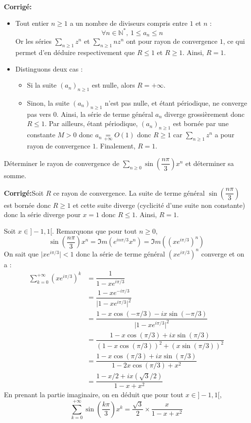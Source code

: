\documentclass[a4paper,twoside,french,11pt]{VcCours}
\newcommand{\Sum}[2]{\sum_{#1}^{#2}}
\newcommand{\corr}{\textbf{Corrigé:}}
\begin{document}
\newpage

\corr 
\begin{itemize}
\item Tout entier $n\geq 1$ a un nombre de diviseurs compris entre $1$ et $n$ :
\[
\forall n\in\mathbb{N}^*,\ 1\leq a_n \leq n
\]
Or les séries $\Sum{n\geq 1}{} z^n$ et $\Sum{n\geq 1}{}n z^n$ ont pour rayon de convergence $1$, ce qui permet d'en déduire respectivement que $R\leq 1$ et $R\geq 1$.  Ainsi, $R=1$.
\item Distinguons deux cas :
\begin{itemize}
\item Si la suite $(a_n)_{n\geq 1}$ est nulle, alors $R=+\infty$.
\item Sinon, la suite $(a_n)_{n\geq 1}$ n'est pas nulle, et étant périodique, ne converge pas vers $0$. Ainsi, la série de terme général $a_n$ diverge grossièrement donc $R\leq 1$. Par ailleurs, étant périodique, $(a_n)_{n\geq 1}$ est bornée par une constante $M>0$ donc $a_n  \underset{+ \infty}{=} O(1)$ donc $R \geq 1$ car $\Sum{n\geq 1}{} z^n$ a pour rayon de convergence $1$. Finalement, $R=1$.
\end{itemize}
\end{itemize}

\begin{Exercice}{}
Déterminer le rayon de convergence de $\Sum{n\geq 0}{} \sin \left( \dfrac{n \pi}{3} \right) x^n$ et déterminer sa somme.
\end{Exercice}

\corr Soit $R$ ce rayon de convergence. La suite de terme général $\sin \left( \dfrac{n \pi}{3} \right)$ est bornée donc $R \geq 1$ et cette suite diverge (cyclicité d'une suite non constante) donc la série diverge pour $x=1$ donc $R \leq 1$. Ainsi, $R=1$.


Soit $x \in ]-1,1[$. Remarquons que pour tout $n \geq 0$,
$$ \sin \left( \dfrac{n \pi}{3} \right) x^n = \Im m (e^{in \pi/3} x^n) = \Im m ((xe^{i \pi/3})^n)$$
On sait que $\vert xe^{i \pi/3} \vert <1$ donc la série de terme général $(xe^{i \pi/3})^n$ converge et on a :
\begin{align*}
\sum_{k=0}^{+ \infty} (xe^{i \pi/3})^k & = \dfrac{1}{1-xe^{i \pi/3}} \\
& = \dfrac{1-xe^{-i \pi/3}}{\vert 1-x e^{i \pi/3}\vert^2} \\
& = \dfrac{1-x \cos(-\pi/3)-i x\sin(-\pi/3)}{\vert 1-x e^{i \pi/3}\vert^2} \\
& = \dfrac{1-x \cos(\pi/3)+i x\sin(\pi/3)}{(1-x \cos(\pi/3))^2+ (x\sin(\pi/3))^2} \\
& = \dfrac{1-x \cos(\pi/3)+i x\sin(\pi/3)}{1-2x \cos(\pi/3)+x^2} \\
& = \dfrac{1-x/2 +i x(\sqrt{3}/2)}{1-x+x^2} 
\end{align*}
En prenant la partie imaginaire, on en déduit que pour tout $x \in ]-1,1[$,
$$ \sum_{k=0}^{+ \infty} \sin \left( \dfrac{k \pi}{3} \right) x^k =\dfrac{\sqrt{3}}{2} \times \dfrac{x}{1-x+x^2}$$
\end{document}
